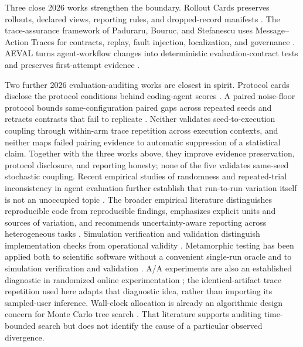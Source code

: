\documentclass[aps,reprint,superscriptaddress,longbibliography,floatfix]{revtex4-2}
\begin{document}
Three close 2026 works strengthen the boundary.  Rollout Cards preserves
rollouts, declared views, reporting rules, and dropped-record manifests
\cite{masters2026rolloutcards}.  The trace-assurance framework of Paduraru,
Bouruc, and Stefanescu uses Message--Action Traces for contracts, replay,
fault injection, localization, and governance
\cite{paduraru2026traceassurance}.  AEVAL turns agent-workflow changes into
deterministic evaluation-contract tests and preserves first-attempt evidence
\cite{anand2026aeval}.

Two further 2026 evaluation-auditing works are closest
in spirit.  Protocol cards disclose the protocol conditions behind coding-agent
scores \cite{zhang2026protocolcards}.  A paired noise-floor protocol bounds
same-configuration paired gaps across repeated seeds and retracts contrasts
that fail to replicate \cite{kaliyev2026noisefloor}.  Neither validates
seed-to-execution coupling through within-arm trace repetition across
execution contexts, and neither maps failed pairing evidence to automatic
suppression of a statistical claim.  Together with the three works above, they
improve evidence preservation, protocol disclosure, and reporting honesty;
none of the five validates same-seed stochastic coupling.  Recent empirical
studies of randomness and repeated-trial inconsistency in
agent evaluation further establish that run-to-run variation itself is not an
unoccupied topic \cite{bjarnason2026randomness,mustahsan2025stochasticity}.
The broader empirical literature distinguishes reproducible code from
reproducible findings, emphasizes explicit units and sources of variation, and
recommends uncertainty-aware reporting across heterogeneous tasks
\cite{bouthillier2019reproducible,patterson2024empirical,agarwal2021statistical,pineau2021reproducibility}.
Simulation verification and validation distinguish implementation checks from
operational validity \cite{sargent2013verification}.  Metamorphic testing has
been applied both to scientific software without a convenient single-run
oracle and to simulation verification and validation
\cite{lin2020exploratorymt,raunak2021metamorphic}.  A/A experiments are also an
established diagnostic in randomized online experimentation
\cite{kohavi2010aa}; the identical-artifact trace repetition used here adapts
that diagnostic idea, rather than importing its sampled-user inference.
Wall-clock allocation is already an algorithmic design concern for Monte Carlo
tree search \cite{baier2016timemanagement}.  That literature supports auditing
time-bounded search but does not identify the cause of a particular observed
divergence.
\end{document}
